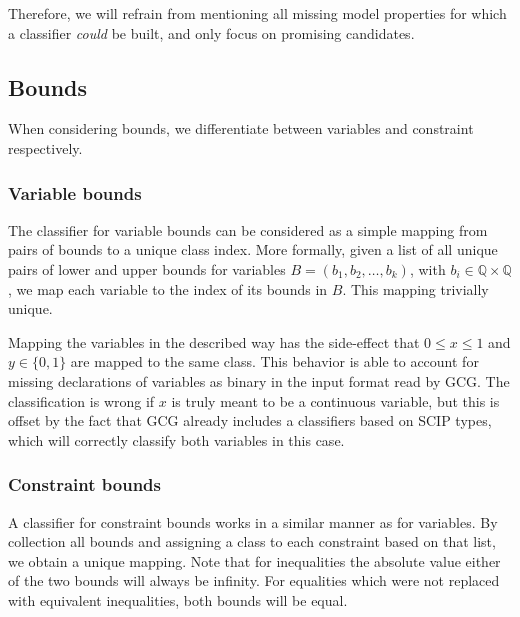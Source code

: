 		Therefore, we will refrain from mentioning all missing model properties for which a classifier \textit{could} be built, and only focus on promising candidates. 
		
		\clearpage
		
		\subsection{Bounds}
			
			When considering bounds, we differentiate between variables and constraint respectively.
			
			\subsubsection{Variable bounds}
			
				The classifier for variable bounds can be considered as a simple mapping from pairs of bounds to a unique class index.
				More formally, given a list of all unique pairs of lower and upper bounds for variables $B = (b_1, b_2, \ldots, b_k)$, with $b_i \in \mathbb{Q} \times \mathbb{Q}$, we map each variable to the index of its bounds in $B$.
				This mapping trivially unique.
				
				Mapping the variables in the described way has the side-effect that $0 \leq x \leq 1$ and $y \in \{ 0, 1 \} $ are mapped to the same class.
				This behavior is able to account for missing declarations of variables as binary in the input format read by \ac{GCG}.
				The classification is wrong if $x$ is truly meant to be a continuous variable, but this is offset by the fact that \ac{GCG} already includes a classifiers based on \ac{SCIP} types, which will correctly classify both variables in this case.
				
				
			\subsubsection{Constraint bounds}
			
				A classifier for constraint bounds works in a similar manner as for variables.
				By collection all bounds and assigning a class to each constraint based on that list, we obtain a unique mapping.
				Note that for inequalities the absolute value either of the two bounds will always be infinity. For equalities which were not replaced with equivalent inequalities, both bounds will be equal.
				

